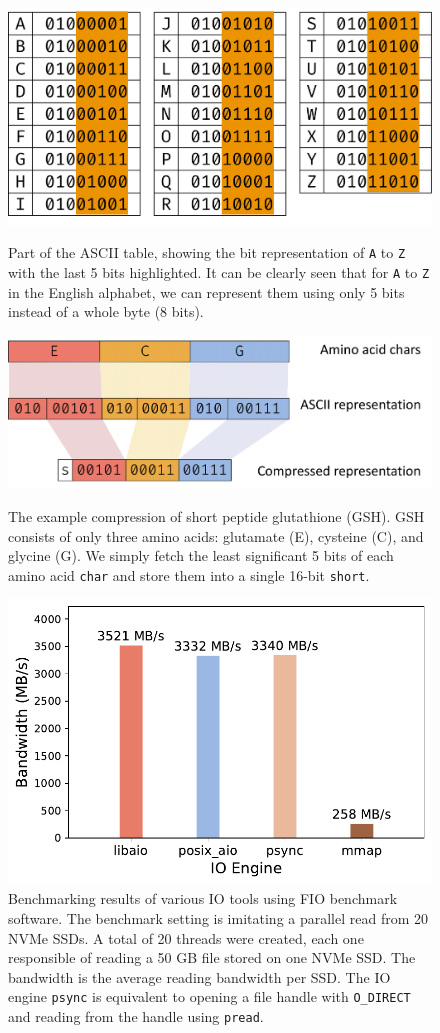 \begin{figpage}
  \thispagestyle{fancy}
  \begin{figure}[htbp]
    \centering
    \includegraphics[width=.6\textwidth]{images/ASCII_prot.pdf}
    \caption{Part of the ASCII table, showing the bit representation of \texttt{A} to \texttt{Z} with the last 5 bits highlighted. It can be clearly seen that for \texttt{A} to \texttt{Z} in the English alphabet, we can represent them using only 5 bits instead of a whole byte (8 bits).}
    \label{fig:ascii_prot}
    \bigskip
    \centering
    \includegraphics[width=.9\textwidth]{images/prot_seq_compress.pdf}
    \caption{The example compression of short peptide glutathione (GSH). GSH consists of only three amino acids: glutamate (E), cysteine (C), and glycine (G). We simply fetch the least significant 5 bits of each amino acid \texttt{char} and store them into a single 16-bit \texttt{short}.}
    \label{fig:prot_seq_compress}
    \bigskip
    \centering
    \includegraphics[width=.65\textwidth]{images/fio_benchmark.pdf}
    \caption{Benchmarking results of various IO tools using FIO benchmark software. The benchmark setting is imitating a parallel read from 20 NVMe SSDs. A total of 20 threads were created, each one responsible of reading a 50 GB file stored on one NVMe SSD. The bandwidth is the average reading bandwidth per SSD. The IO engine \texttt{psync} is equivalent to opening a file handle with \texttt{O\_DIRECT} and reading from the handle using \texttt{pread}.}
    \label{fig:fio_benchmark}
  \end{figure}
\end{figpage}

